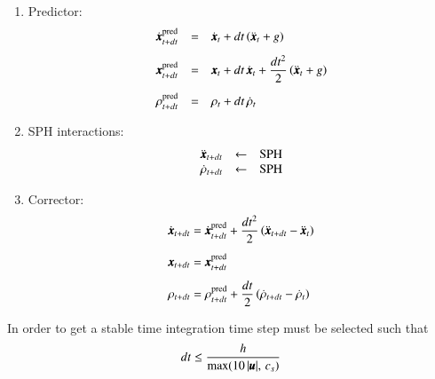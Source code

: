 \begin{enumerate}
	\item Predictor:
	\begin{eqnarray}
	\label{eq:sph:discrete:timestep:predictor}
	\begin{array}{lcl}
	\dsty{\dot{\bs{x}}_{t+dt}^{\mathrm{pred}}} & = & 
	\dot{\bs{x}}_{t} + 
	dt \left(
		\ddot{\bs{x}}_{t} + g
	\right)
	\vspace{0.3cm} \\
	\dsty{\bs{x}_{t+dt}^{\mathrm{pred}}} & = &
	\bs{x}_{t} + 
	dt \, \dot{\bs{x}}_{t} + 
	\dsty{\frac{dt^2}{2}} \left(
		\ddot{\bs{x}}_{t} + g
	\right)
	\vspace{0.3cm} \\
	\dsty{\rho_{t+dt}^{\mathrm{pred}}} & = & 
	\rho_{t} + 
	dt \, \dot\rho_{t}
	\end{array}
	\end{eqnarray}

	\item SPH interactions:
	\begin{eqnarray}
	\label{eq:sph:discrete:timestep:interactions}
	\begin{array}{lcl}
	\ddot{\pmb{x}}_{t+dt} & \leftarrow & \mbox{SPH}
	\\
	\dot\rho_{t+dt} & \leftarrow & \mbox{SPH}
	\end{array}
	\end{eqnarray}

	\item Corrector:
	\begin{eqnarray}
	\label{eq:sph:discrete:timestep:corrector}
	\begin{array}{lcl}
	\dsty{\dot{\bs{x}}_{t+dt}} = 
	\dsty{\dot{\bs{x}}_{t+dt}^{\mathrm{pred}}} + 
	\dsty{\frac{dt^2}{2}} \left(
		\ddot{\bs{x}}_{t+dt} - \ddot{\bs{x}}_{t}
	\right)
	\vspace{0.3cm} \\
	\dsty{\bs{x}_{t+dt}} = \dsty{\bs{x}_{t+dt}^{\mathrm{pred}}}
	\vspace{0.3cm} \\
	\dsty{\rho_{t+dt}} = 
	\dsty{\rho_{t+dt}^{\mathrm{pred}}} + 
	\dsty{\frac{dt}{2}} \left(
		\dot\rho_{t+dt} - \dot\rho_{t}
	\right)
	\end{array}
	\end{eqnarray}
\end{enumerate}
%
In order to get a stable time integration time step must be selected such that
%
\begin{eqnarray}
\label{eq:sph:discrete:timestep:dtmax}
dt \le \frac{h}{\max(10 \, \vert \pmb{u} \vert, \, c_s)}
\end{eqnarray}
